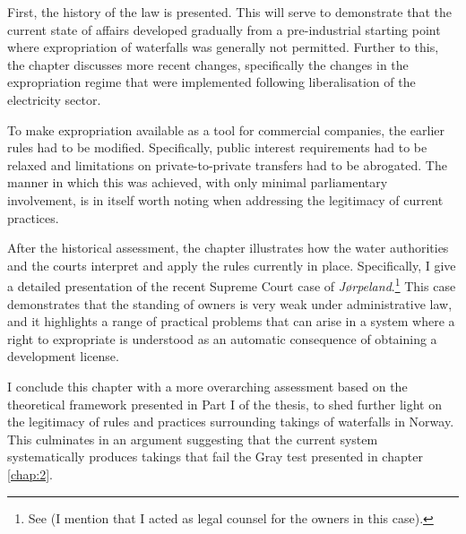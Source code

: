 First, the history of the law is presented. This will serve to demonstrate that the current state of affairs developed gradually from a pre-industrial starting point where expropriation of waterfalls was generally not permitted. Further to this, the chapter discusses more recent changes, specifically the changes in the expropriation regime that were implemented following liberalisation of the electricity sector.

To make expropriation available as a tool for commercial companies, the earlier rules had to be modified. Specifically, public interest requirements had to be relaxed and limitations on private-to-private transfers had to be abrogated. The manner in which this was achieved, with only minimal parliamentary involvement, is in itself worth noting when addressing the legitimacy of current practices.

After the historical assessment, the chapter illustrates how the water authorities and the courts interpret and apply the rules currently in place. Specifically, I give a detailed presentation of the recent Supreme Court case of {\it Jørpeland}.\footnote{See \cite{jorpeland11} (I mention that I acted as legal counsel for the owners in this case).} This case demonstrates that the standing of owners is very weak under administrative law, and it highlights a range of practical problems that can arise in a system where a right to expropriate is understood as an automatic consequence of obtaining a development license.


I conclude this chapter with a more overarching assessment based on the theoretical framework presented in Part I of the thesis, to shed further light on the legitimacy of rules and practices surrounding takings of waterfalls in Norway. This culminates in an argument suggesting that the current system systematically produces takings that fail the Gray test presented in chapter \ref{chap:2}. %

